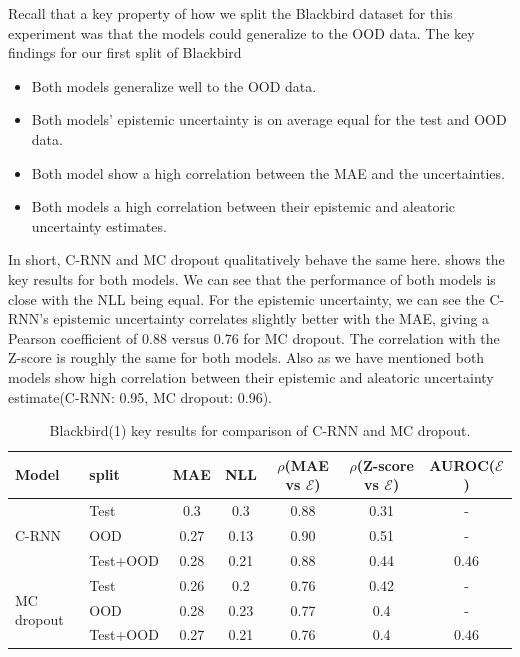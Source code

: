 Recall that a key property of how we split the Blackbird dataset for this experiment was that the models could generalize to the OOD data. The key findings for our first split of Blackbird

\begin{itemize}
    \item Both models generalize well to the OOD data.
    \item Both models' epistemic uncertainty is on average equal for the test and OOD data.
    \item Both model show a high correlation between the MAE and the uncertainties.
    \item Both models a high correlation between their epistemic and aleatoric uncertainty estimates. 
\end{itemize}{}

In short, C-RNN and MC dropout qualitatively behave the same here.  shows the key results for both models. We can see that the performance of both models is close with the NLL being equal. For the epistemic uncertainty, we can see the C-RNN's epistemic uncertainty correlates slightly better with the MAE, giving a Pearson coefficient of 0.88 versus 0.76 for MC dropout. The correlation with the Z-score is roughly the same for both models. Also as we have mentioned both models show high correlation between their epistemic and aleatoric uncertainty estimate(C-RNN: 0.95, MC dropout: 0.96).  


\begin{table}[h]
\centering
    \begin{tabular}{l l c c c c c}  
        \toprule
        Model & split & MAE & NLL & $\rho$(MAE vs $\mathcal{E}$) &
        $\rho$(Z-score vs $\mathcal{E}$) & AUROC($\mathcal{E}$)\\
        \midrule
        \multirow{3}{*}{C-RNN} 
            & Test     & 0.3  & 0.3  & 0.88  & 0.31 & - \\  
            & OOD      & 0.27 & 0.13 & 0.90  & 0.51 & -\\  
            & Test+OOD & 0.28 & 0.21 & 0.88  & 0.44 & 0.46\\ 

        \midrule
        \multirow{3}{*}{MC dropout} 
            & Test     & 0.26 & 0.2  & 0.76  & 0.42 & - \\  
            & OOD      & 0.28 & 0.23 & 0.77  & 0.4 & -\\  
            & Test+OOD & 0.27 & 0.21 & 0.76  & 0.4 & 0.46\\ 

        \toprule
    \end{tabular}
    \caption{Blackbird(1) key results for comparison of C-RNN and MC dropout.}
    \label{tbl:bb1_comparison}
\end{table}


